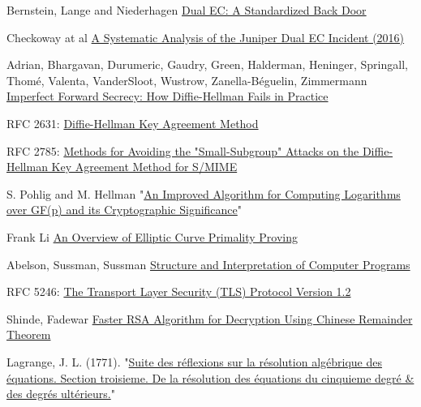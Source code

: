 \documentclass[a4paper,11pt,twocolumn]{article}
\begin{document}
\begin{thebibliography}{1}

 Bernstein, Lange and Niederhagen \href{https://eprint.iacr.org/2015/767.pdf}{Dual EC: A Standardized Back Door}

 Checkoway at al \href{http://eprint.iacr.org/2016/376}{A Systematic Analysis of the Juniper Dual EC Incident (2016)}

 Adrian, Bhargavan, Durumeric, Gaudry, Green, Halderman, Heninger, Springall, Thomé, Valenta,  VanderSloot, Wustrow, Zanella-Béguelin, Zimmermann \href{https://weakdh.org/imperfect-forward-secrecy-ccs15.pdf}{Imperfect Forward Secrecy: How Diffie-Hellman Fails in Practice}

 RFC 2631: \href{https://tools.ietf.org/html/rfc2631}{Diffie-Hellman Key Agreement Method}

 RFC 2785: \href{https://tools.ietf.org/html/rfc2785}{Methods for Avoiding the "Small-Subgroup" Attacks on the Diffie-Hellman Key Agreement Method for S/MIME}

 S. Pohlig and M. Hellman "\href{http://www-ee.stanford.edu/~hellman/publications/28.pdf}{An Improved Algorithm for Computing Logarithms over GF(p) and its Cryptographic Significance}"

 Frank Li \href{http://theory.stanford.edu/~dfreeman/cs259c-f11/finalpapers/primalityproving.pdf}{An Overview of Elliptic Curve Primality Proving}

 Abelson, Sussman, Sussman \href{https://mitpress.mit.edu/sicp/chapter1/footnode.html#2413}{Structure and Interpretation of Computer Programs}

 RFC 5246: \href{https://www.ietf.org/rfc/rfc5246.txt}{The Transport Layer Security (TLS) Protocol Version 1.2}

 Shinde, Fadewar \href{http://www.techscience.com/doi/10.3970/icces.2008.005.255.pdf}{Faster RSA Algorithm for Decryption Using Chinese
Remainder Theorem}

 Lagrange, J. L. (1771). "\href{https://books.google.com/books?id=_-U_AAAAYAAJ&pg=PA138#v=onepage&q&f=false}{Suite des réflexions sur la résolution algébrique des équations. Section troisieme. De la résolution des équations du cinquieme degré & des degrés ultérieurs.}"

\end{thebibliography}
\end{document}
